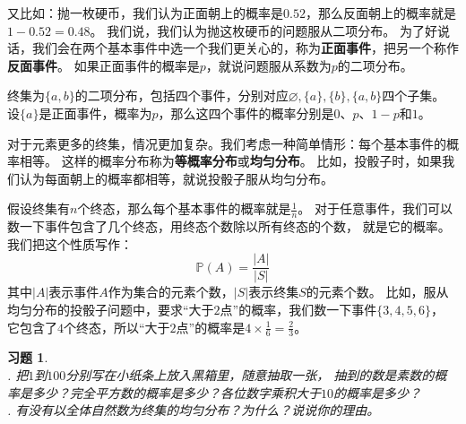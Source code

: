 \documentclass[12pt,UTF8]{ctexbook}
\newtheorem{xt}{习题}[section]
\begin{document}
又比如：抛一枚硬币，我们认为正面朝上的概率是$0.52$，那么反面朝上的概率就是$1 - 0.52 = 0.48$。
我们说，我们认为抛这枚硬币的问题服从二项分布。
为了好说话，我们会在两个基本事件中选一个我们更关心的，称为\textbf{正面事件}，把另一个称作\textbf{反面事件}。
如果正面事件的概率是$p$，就说问题服从系数为$p$的二项分布。

终集为$\{a, b\}$的二项分布，包括四个事件，分别对应$\varnothing, \{a\}, \{b\}, \{a, b\}$四个子集。
设$\{a\}$是正面事件，概率为$p$，那么这四个事件的概率分别是$0$、$p$、$1-p$和$1$。

对于元素更多的终集，情况更加复杂。我们考虑一种简单情形：每个基本事件的概率相等。
这样的概率分布称为\textbf{等概率分布}或\textbf{均匀分布}。
比如，投骰子时，如果我们认为每面朝上的概率都相等，就说投骰子服从均匀分布。

假设终集有$n$个终态，那么每个基本事件的概率就是$\frac{1}{n}$。
对于任意事件，我们可以数一下事件包含了几个终态，用终态个数除以所有终态的个数，
就是它的概率。我们把这个性质写作：
$$ \mathbb{P}(A) = \frac{|A|}{|S|} $$
其中$|A|$表示事件$A$作为集合的元素个数，$|S|$表示终集$S$的元素个数。 
比如，服从均匀分布的投骰子问题中，要求“大于$2$点”的概率，我们数一下事件$\{3,4,5,6\}$，
它包含了$4$个终态，所以“大于$2$点”的概率是$4 \times \frac{1}{6} = \frac{2}{3}$。

\begin{xt}
    \mbox{} \\
    . 把$1$到$100$分别写在小纸条上放入黑箱里，随意抽取一张，
    抽到的数是素数的概率是多少？完全平方数的概率是多少？各位数字乘积大于$10$的概率是多少？ \\
    . 有没有以全体自然数为终集的均匀分布？为什么？说说你的理由。
\end{xt}


\end{document}
